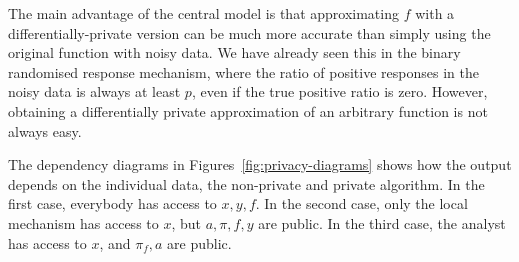 \begin{frame}
{    The main advantage of the central model is that
    approximating $f$ with a differentially-private version can be
    much more accurate than simply using the original function with
    noisy data. We have already seen this in the binary randomised
    response mechanism, where the ratio of positive responses in the
    noisy data is always at least $p$, even if the true positive ratio
    is zero. However, obtaining a differentially private approximation
    of an arbitrary function is not always easy.

    The dependency diagrams in Figures~\ref{fig:privacy-diagrams} shows
    how the output depends on the individual data, the non-private and
    private algorithm. In the first case, everybody has access to $x, y, f$. In the second case, only the local mechanism has access to $x$, but $a, \pi, f, y$ are public. In the third case, the analyst has access to $x$, and $\pi_f, a$ are public.
  }
  

\end{frame}
